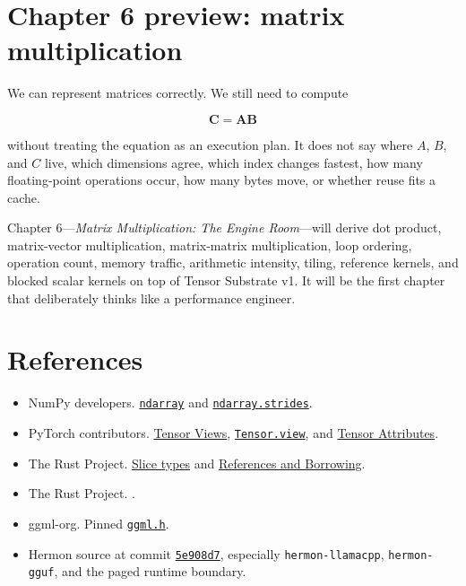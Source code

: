 \section{Chapter 6 preview: matrix
multiplication}\label{chapter-6-preview-matrix-multiplication}

We can represent matrices correctly. We still need to compute

\begin{equation}
\mathbf{C}=\mathbf{A}\mathbf{B}
\end{equation}

without treating the equation as an execution plan. It does not say
where \(A\), \(B\), and \(C\) live, which dimensions agree, which index
changes fastest, how many floating-point operations occur, how many
bytes move, or whether reuse fits a cache.

Chapter 6---\emph{Matrix Multiplication: The Engine Room}---will derive
dot product, matrix-vector multiplication, matrix-matrix multiplication,
loop ordering, operation count, memory traffic, arithmetic intensity,
tiling, reference kernels, and blocked scalar kernels on top of Tensor
Substrate v1. It will be the first chapter that deliberately thinks like
a performance engineer.

\section{References}\label{references-2}

\begin{itemize}
\tightlist
\item
  NumPy developers.
  \href{https://numpy.org/doc/stable/reference/generated/numpy.ndarray.html}{\texttt{ndarray}}
  and
  \href{https://numpy.org/doc/stable/reference/generated/numpy.ndarray.strides.html}{\texttt{ndarray.strides}}.
\item
  PyTorch contributors.
  \href{https://docs.pytorch.org/docs/stable/tensor_view.html}{Tensor
  Views},
  \href{https://docs.pytorch.org/docs/stable/generated/torch.Tensor.view.html}{\texttt{Tensor.view}},
  and
  \href{https://docs.pytorch.org/docs/stable/tensor_attributes.html}{Tensor
  Attributes}.
\item
The Rust Project.
  \href{https://doc.rust-lang.org/stable/reference/types/slice.html}{Slice
  types} and
  \href{https://doc.rust-lang.org/stable/book/ch04-02-references-and-borrowing.html}{References
  and Borrowing}.
\item
The Rust Project.
  \href{https://doc.rust-lang.org/std/primitive.usize.html\#method.checked_mul}{\texttt{}}.
\item
  ggml-org. Pinned
  \href{https://github.com/ggml-org/llama.cpp/blob/389ff61d77b5c71cec0cf92fe4e5d01ace80b797/ggml/include/ggml.h}{\texttt{ggml.h}}.
\item
  Hermon source at commit
  \href{https://github.com/hermonai/hermon/commit/5e908d75e4d5ee102f97f6a880ed4d0968d949df}{\texttt{5e908d7}},
  especially \texttt{hermon-llamacpp}, \texttt{hermon-gguf}, and the
  paged runtime boundary.
\end{itemize}



